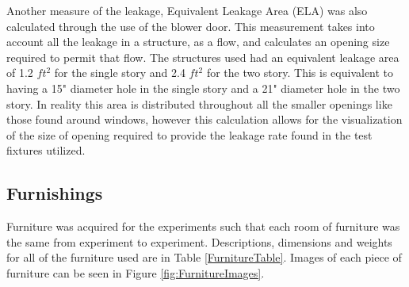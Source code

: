 \documentclass{article}
\begin{document}
Another measure of the leakage, Equivalent Leakage Area (ELA) was also calculated through the use of the blower door. This measurement takes into account all the leakage in a structure, as a flow, and calculates an opening size required to permit that flow. The structures used had an equivalent leakage area of 1.2 $ft^2$ for the single story and 2.4 $ft^2$ for the two story. This is equivalent to having a 15" diameter hole in the single story and a 21" diameter hole in the two story. In reality this area is distributed throughout all the smaller openings like those found around windows, however this calculation allows for the visualization of the size of opening required to provide the leakage rate found in the test fixtures utilized. 

\subsection{Furnishings}

Furniture was acquired for the experiments such that each room of furniture was the same from experiment to experiment. Descriptions, dimensions and weights for all of the furniture used are in Table \ref{FurnitureTable}. Images of each piece of furniture can be seen in Figure \ref{fig:FurnitureImages}.
\end{document}

